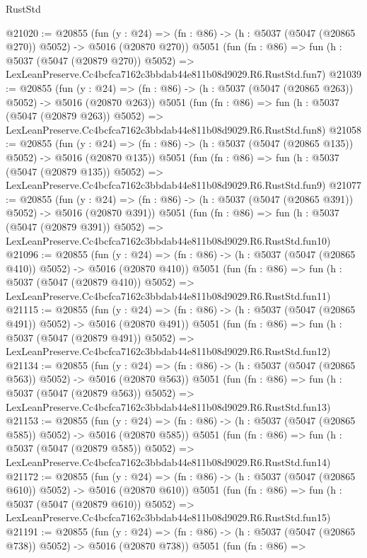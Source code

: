 \begin{lexlean}{RustStd}
\begin{coremodule}
@21020 := @20855
    (fun (y : @24) => (fn : @86) -> (h : @5037 (@5047 (@20865 @270)) @5052) -> @5016 (@20870 @270))
    @5051
    (fun (fn : @86) =>
    fun (h : @5037 (@5047 (@20879 @270)) @5052) =>
    LexLeanPreserve.Cc4bcfca7162c3bbdab44e811b08d9029.R6.RustStd.fun7)
@21039 := @20855
    (fun (y : @24) => (fn : @86) -> (h : @5037 (@5047 (@20865 @263)) @5052) -> @5016 (@20870 @263))
    @5051
    (fun (fn : @86) =>
    fun (h : @5037 (@5047 (@20879 @263)) @5052) =>
    LexLeanPreserve.Cc4bcfca7162c3bbdab44e811b08d9029.R6.RustStd.fun8)
@21058 := @20855
    (fun (y : @24) => (fn : @86) -> (h : @5037 (@5047 (@20865 @135)) @5052) -> @5016 (@20870 @135))
    @5051
    (fun (fn : @86) =>
    fun (h : @5037 (@5047 (@20879 @135)) @5052) =>
    LexLeanPreserve.Cc4bcfca7162c3bbdab44e811b08d9029.R6.RustStd.fun9)
@21077 := @20855
    (fun (y : @24) => (fn : @86) -> (h : @5037 (@5047 (@20865 @391)) @5052) -> @5016 (@20870 @391))
    @5051
    (fun (fn : @86) =>
    fun (h : @5037 (@5047 (@20879 @391)) @5052) =>
    LexLeanPreserve.Cc4bcfca7162c3bbdab44e811b08d9029.R6.RustStd.fun10)
@21096 := @20855
    (fun (y : @24) => (fn : @86) -> (h : @5037 (@5047 (@20865 @410)) @5052) -> @5016 (@20870 @410))
    @5051
    (fun (fn : @86) =>
    fun (h : @5037 (@5047 (@20879 @410)) @5052) =>
    LexLeanPreserve.Cc4bcfca7162c3bbdab44e811b08d9029.R6.RustStd.fun11)
@21115 := @20855
    (fun (y : @24) => (fn : @86) -> (h : @5037 (@5047 (@20865 @491)) @5052) -> @5016 (@20870 @491))
    @5051
    (fun (fn : @86) =>
    fun (h : @5037 (@5047 (@20879 @491)) @5052) =>
    LexLeanPreserve.Cc4bcfca7162c3bbdab44e811b08d9029.R6.RustStd.fun12)
@21134 := @20855
    (fun (y : @24) => (fn : @86) -> (h : @5037 (@5047 (@20865 @563)) @5052) -> @5016 (@20870 @563))
    @5051
    (fun (fn : @86) =>
    fun (h : @5037 (@5047 (@20879 @563)) @5052) =>
    LexLeanPreserve.Cc4bcfca7162c3bbdab44e811b08d9029.R6.RustStd.fun13)
@21153 := @20855
    (fun (y : @24) => (fn : @86) -> (h : @5037 (@5047 (@20865 @585)) @5052) -> @5016 (@20870 @585))
    @5051
    (fun (fn : @86) =>
    fun (h : @5037 (@5047 (@20879 @585)) @5052) =>
    LexLeanPreserve.Cc4bcfca7162c3bbdab44e811b08d9029.R6.RustStd.fun14)
@21172 := @20855
    (fun (y : @24) => (fn : @86) -> (h : @5037 (@5047 (@20865 @610)) @5052) -> @5016 (@20870 @610))
    @5051
    (fun (fn : @86) =>
    fun (h : @5037 (@5047 (@20879 @610)) @5052) =>
    LexLeanPreserve.Cc4bcfca7162c3bbdab44e811b08d9029.R6.RustStd.fun15)
@21191 := @20855
    (fun (y : @24) => (fn : @86) -> (h : @5037 (@5047 (@20865 @738)) @5052) -> @5016 (@20870 @738))
    @5051
    (fun (fn : @86) =>

\end{coremodule}
\end{lexlean}
